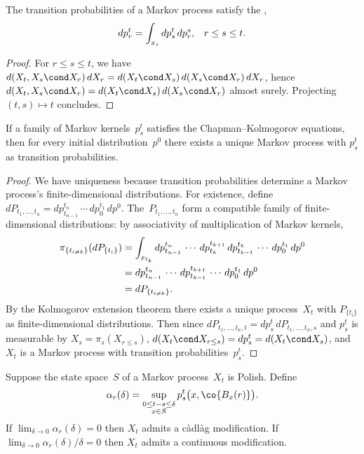 \begin	{corollary}
The transition probabilities of a Markov process
satisfy the , \[
	dp^t_r = \int_{x_s} dp^t_s\,dp^s_r \text,
	\quad r \le s \le t \text.
\]
\end	{corollary}
\begin	{proof}
For \( r \le s \le t \), we have
\( d(X_t,X_s\cond X_r)\,dX_r = d(X_t\cond X_s)\,d(X_s\cond X_r)\,dX_r \),
hence \( d(X_t,X_s\cond X_r) = d(X_t\cond X_s)\,d(X_s\cond X_r) \)
almost surely.
Projecting \( (t,s) \mapsto t \) concludes.
\end	{proof}

\begin	{theorem}
If a family of Markov kernels~$p^t_s$
satisfies the Chapman--Kolmogorov equations,
then for every initial distribution~$p^0$ there exists a unique Markov process
with $p^t_s$ as transition probabilities.
\end	{theorem}
\begin	{proof}
We have uniqueness because transition probabilities determine
a Markov process's finite-dimensional distributions.
For existence, define
\( dP_{t_1,\dots,t_n} = dp^{t_n}_{t_{n-1}} \,\dotsm\, dp^{t_1}_0 \, dp^0 \).
The~$P_{t_1,\dots,t_n}$ form a compatible family
of finite-dimensional distributions:
by associativity of multiplication of Markov kernels,
\begin	{align*}
	\pi_{\{t_{i\ne k}\}}(dP_{\{t_i\}})
	&=	\int_{x_{t_k}} dp^{t_n}_{t_{n-1}} \,\dotsm\,
		dp^{t_{k+1}}_{t_k} \, dp^{t_k}_{t_{k-1}} \,\dotsm\,
		dp^{t_1}_0 \, dp^0 \\
	&=	dp^{t_n}_{t_{n-1}} \,\dotsm\, dp^{t_{k+1}}_{t_{k-1}}
		\,\dotsm\, dp^{t_1}_0 \, dp^0 \\
	&=	dP_{\{t_{i\ne k}\}} \text.
\end	{align*}
By the Kolmogorov extension theorem there exists a unique process~$X_t$
with $P_{\{t_i\}}$ as finite-dimensional distributions.
Then since
\( dP_{t_1,\dots,t_n,t} = dp^t_s \, dP_{t_1,\dots,t_n,s} \)
and $p^t_s$ is measurable by \( X_s = \pi_s(X_{r\le s}) \),
\( d(X_t\cond X_{r\le s}) = dp^t_s = d(X_t\cond X_s) \),
and $X_t$ is a Markov process with transition probabilities~$p^t_s$.
\end	{proof}

\begin	{theorem}[Dynkin]
Suppose the state space~$S$ of a Markov process~$X_t$ is Polish.
Define \[
	\alpha_r(\delta) = \sup_{\substack
		{0\le t-s\le\delta \\
		x \in S}}
		p^t_s\bigl(x,\co{B_x(r)}\bigr)
	\text.
\]
If \( \lim_{\delta\to0} \alpha_r(\delta) = 0 \)
then $X_t$ admits a càdlàg modification.
If \( \lim_{\delta\to0} \alpha_r(\delta)/\delta = 0 \)
then $X_t$ admits a continuous modification.
\end	{theorem}
